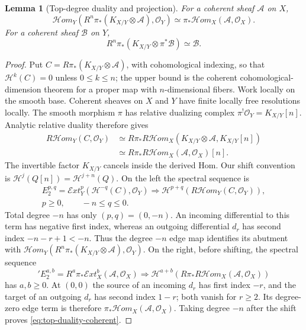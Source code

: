 \documentclass[11pt,reqno]{amsart}
\numberwithin{equation}{section}
\newtheorem{lemma}[theorem]{Lemma}
\theoremstyle{definition}
\theoremstyle{remark}
\begin{document}
\begin{lemma}[Top-degree duality and projection]
\label{lem:top-duality-projection}
For a coherent sheaf $\mathcal A$ on $X$,
\begin{equation}\label{eq:top-duality-coherent}
 \mathcal Hom_Y\!\left(
 R^n\pi_*(K_{X/Y}\otimes\mathcal A),\mathcal O_Y\right)
 \simeq \pi_*\mathcal Hom_X(\mathcal A,\mathcal O_X).
\end{equation}
For a coherent sheaf $\mathcal B$ on $Y$,
\begin{equation}\label{eq:top-projection-coherent}
 R^n\pi_*(K_{X/Y}\otimes\pi^*\mathcal B)
 \simeq\mathcal B.
\end{equation}
\end{lemma}
\begin{proof}
Put $C=R\pi_*(K_{X/Y}\otimes\mathcal A)$, with cohomological indexing,
so that $\mathcal H^k(C)=0$ unless $0\leq k\leq n$; the upper bound
is the coherent cohomological-dimension theorem for a proper map
with $n$-dimensional fibers.  Work locally on the smooth base.
Coherent sheaves on $X$ and $Y$ have finite locally free resolutions
locally.  The smooth morphism $\pi$ has relative dualizing complex
$\pi^!\mathcal O_Y=K_{X/Y}[n]$.  Analytic relative duality
\cite{RRV71} therefore gives
\[
 \begin{aligned}
 R\mathcal Hom_Y(C,\mathcal O_Y)
 &\simeq R\pi_*R\mathcal Hom_X
       (K_{X/Y}\otimes\mathcal A,K_{X/Y}[n])\\
 &\simeq R\pi_*R\mathcal Hom_X(\mathcal A,\mathcal O_X)[n].
 \end{aligned}
\]
The invertible factor $K_{X/Y}$ cancels inside the derived Hom.
Our shift convention is $\mathcal H^j(Q[n])=\mathcal H^{j+n}(Q)$.
On the left the spectral sequence is
\[
 \begin{gathered}
 E_2^{p,q}=\mathcal Ext_Y^p(\mathcal H^{-q}(C),\mathcal O_Y)
 \Longrightarrow
 \mathcal H^{p+q}(R\mathcal Hom_Y(C,\mathcal O_Y)),\\
 p\geq0,\qquad -n\leq q\leq0.
 \end{gathered}
\]
Total degree $-n$ has only $(p,q)=(0,-n)$. An incoming differential
to this term has negative first index, whereas an outgoing differential
$d_r$ has second index $-n-r+1<-n$. Thus the degree $-n$ edge map
identifies its abutment with
$\mathcal Hom_Y(R^n\pi_*(K_{X/Y}\otimes\mathcal A),\mathcal O_Y)$.
On the right, before shifting, the spectral sequence
\[
 {}'E_2^{a,b}=R^a\pi_*\mathcal Ext_X^b(\mathcal A,\mathcal O_X)
 \Longrightarrow
 \mathcal H^{a+b}(R\pi_*R\mathcal Hom_X(\mathcal A,\mathcal O_X))
\]
has $a,b\geq0$. At $(0,0)$ the source of an incoming $d_r$ has
first index $-r$, and the target of an outgoing $d_r$ has second
index $1-r$; both vanish for $r\geq2$.  Its degree-zero edge term is
therefore $\pi_*\mathcal Hom_X(\mathcal A,\mathcal O_X)$.
Taking degree $-n$ after the shift
proves \eqref{eq:top-duality-coherent}.


\end{proof}
\end{document}
